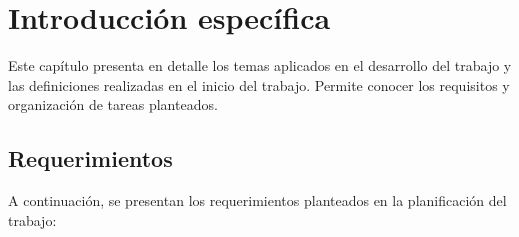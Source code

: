 \chapter{Introducción específica} %

\label{Chapter2}


Este capítulo presenta en detalle los temas aplicados en el desarrollo del trabajo y las definiciones realizadas en el inicio del trabajo. Permite conocer los requisitos y organización de tareas planteados.




\section{Requerimientos}
\label{sec:requerimientos}

A continuación,  se presentan los requerimientos planteados en la planificación del trabajo:

